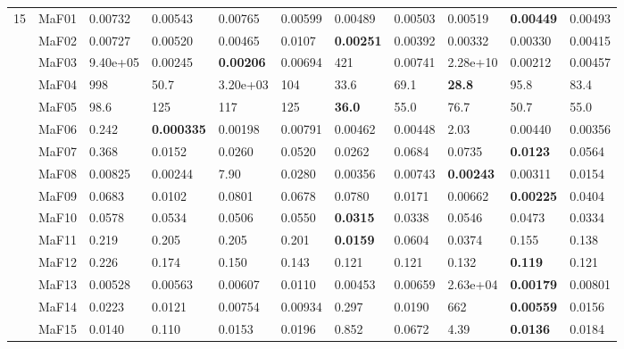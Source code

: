 \documentclass[]{article}
\begin{document}
\begin{landscape}
\begin{table}
\begin{footnotesize}
\begin{tabular}{|l|l|l|l|l|l|l|l|l|l|l|}
\multirow{15}{*}{15} & MaF01 & 0.00732 & 0.00543 & 0.00765 & 0.00599 & \cellcolor{gray95} 0.00489 & \cellcolor{gray95} 0.00503 & 0.00519 & \cellcolor{gray95} {\bf 0.00449} & \cellcolor{gray95} 0.00493\\
 & MaF02 & 0.00727 & 0.00520 & 0.00465 & 0.0107 & \cellcolor{gray95} {\bf 0.00251} & 0.00392 & \cellcolor{gray95} 0.00332 & \cellcolor{gray95} 0.00330 & 0.00415\\
 & MaF03 & 9.40e+05 & \cellcolor{gray95} 0.00245 & \cellcolor{gray95} {\bf 0.00206} & 0.00694 & 421 & 0.00741 & 2.28e+10 & \cellcolor{gray95} 0.00212 & 0.00457\\
 & MaF04 & 998 & \cellcolor{gray95} 50.7 & 3.20e+03 & 104 & \cellcolor{gray95} 33.6 & 69.1 & \cellcolor{gray95} {\bf 28.8} & 95.8 & 83.4\\
 & MaF05 & 98.6 & 125 & 117 & 125 & \cellcolor{gray95} {\bf 36.0} & \cellcolor{gray95} 55.0 & 76.7 & \cellcolor{gray95} 50.7 & \cellcolor{gray95} 55.0\\
 & MaF06 & 0.242 & \cellcolor{gray95} {\bf 0.000335} & \cellcolor{gray95} 0.00198 & 0.00791 & 0.00462 & 0.00448 & 2.03 & 0.00440 & \cellcolor{gray95} 0.00356\\
 & MaF07 & 0.368 & \cellcolor{gray95} 0.0152 & 0.0260 & 0.0520 & 0.0262 & 0.0684 & 0.0735 & \cellcolor{gray95} {\bf 0.0123} & 0.0564\\
 & MaF08 & 0.00825 & \cellcolor{gray95} 0.00244 & 7.90 & 0.0280 & \cellcolor{gray95} 0.00356 & 0.00743 & \cellcolor{gray95} {\bf 0.00243} & \cellcolor{gray95} 0.00311 & 0.0154\\
 & MaF09 & 0.0683 & 0.0102 & 0.0801 & 0.0678 & 0.0780 & 0.0171 & \cellcolor{gray95} 0.00662 & \cellcolor{gray95} {\bf 0.00225} & 0.0404\\
 & MaF10 & 0.0578 & 0.0534 & 0.0506 & 0.0550 & \cellcolor{gray95} {\bf 0.0315} & \cellcolor{gray95} 0.0338 & 0.0546 & 0.0473 & \cellcolor{gray95} 0.0334\\
 & MaF11 & 0.219 & 0.205 & 0.205 & 0.201 & \cellcolor{gray95} {\bf 0.0159} & \cellcolor{gray95} 0.0604 & \cellcolor{gray95} 0.0374 & 0.155 & 0.138\\
 & MaF12 & 0.226 & 0.174 & 0.150 & 0.143 & \cellcolor{gray95} 0.121 & \cellcolor{gray95} 0.121 & 0.132 & \cellcolor{gray95} {\bf 0.119} & \cellcolor{gray95} 0.121\\
 & MaF13 & 0.00528 & 0.00563 & 0.00607 & 0.0110 & 0.00453 & 0.00659 & \cellcolor{gray95} 2.63e+04 & \cellcolor{gray95} {\bf 0.00179} & 0.00801\\
 & MaF14 & 0.0223 & 0.0121 & \cellcolor{gray95} 0.00754 & \cellcolor{gray95} 0.00934 & 0.297 & 0.0190 & 662 & \cellcolor{gray95} {\bf 0.00559} & 0.0156\\
 & MaF15 & \cellcolor{gray95} 0.0140 & 0.110 & \cellcolor{gray95} 0.0153 & 0.0196 & 0.852 & 0.0672 & 4.39 & \cellcolor{gray95} {\bf 0.0136} & 0.0184\\
\hline
\end{tabular}
\end{footnotesize}
\end{table}
\end{landscape}
\end{document}
